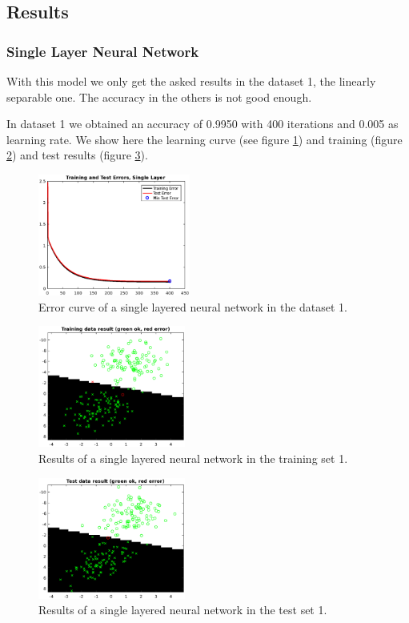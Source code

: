 \documentclass{article}
\begin{document}
\subsection{Results}

\subsubsection{Single Layer Neural Network}

With this model we only get the asked results in the dataset 1, the linearly separable one. The accuracy in the others is not good enough.

In dataset 1 we obtained an accuracy of 0.9950 with 400 iterations and 0.005 as learning rate. We show here the learning curve (see figure \ref{fig:single_data1_error}) and training (figure \ref{fig:single_data1_result_train}) and test results (figure \ref{fig:single_data1_result_test}).

\begin{figure}[!htb]
\centering
\includegraphics[height=4cm]{images/single_data1_error}
\caption{Error curve of a single layered neural network in the dataset 1.}
\label{fig:single_data1_error}
\end{figure}

\begin{figure}[!htb]
\centering
\includegraphics[height=4cm]{images/single_data1_result_train}
\caption{Results of a single layered neural network in the training set 1.}
\label{fig:single_data1_result_train}
\end{figure}

\begin{figure}[!htb]
\centering
\includegraphics[height=4cm]{images/single_data1_result_test}
\caption{Results of a single layered neural network in the test set 1.}
\label{fig:single_data1_result_test}
\end{figure}
\end{document}
